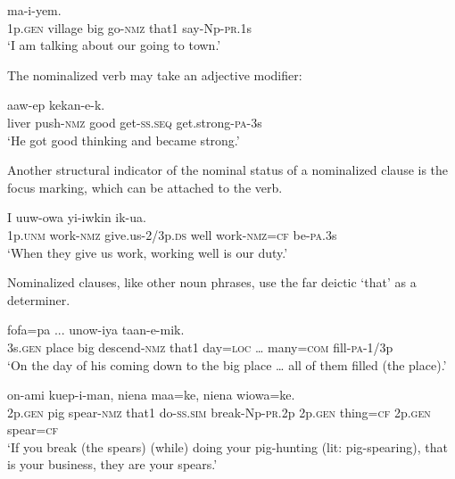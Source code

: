 \ea%
\label{ex:5:x1228}
\gll {}      ma-i-yem. \\
     1p.\textsc{gen}  village  big  go-\textsc{nmz}  that1  say-Np-\textsc{pr}.1s \\
\glt `I am talking about our going to town.'
\z

The nominalized verb may take an adjective modifier:

\ea%
\label{ex:5:x1240}
\gll {}    aaw-ep  kekan-e-k. \\
     liver  push-\textsc{nmz}  good  get-\textsc{ss}.\textsc{seq}  get.strong-\textsc{pa}-3s \\
\glt `He got good thinking and became strong.'
\z

Another structural indicator of the nominal status of a nominalized clause is the focus marking, which can be attached to the verb. 

\ea%
\label{ex:5:x1238}
\gll I  uuw-owa  yi-iwkin    ik-ua. \\
     1p.\textsc{unm}  work-\textsc{nmz}  give.us-2/3p.\textsc{ds}  well  work-\textsc{nmz}=\textsc{cf} be-\textsc{pa}.3s \\
\glt `When they give us work, working well is our duty.'
\z

Nominalized clauses, like other noun phrases, use the far deictic  `that' as a determiner. 

\ea%
\label{ex:5:x1842}
    fofa=pa  ...  unow-iya taan-e-mik. \\
     3s.\textsc{gen}  place  big  descend-\textsc{nmz}  that1  day=\textsc{loc}  {\dots}  many=\textsc{com} fill-\textsc{pa}-1/3p \\
\glt `On the day of his coming down to the big place {\dots} all of them filled (the place).'
\z

\ea%
\label{ex:5:x1843}
    on-ami  kuep-i-man, niena  maa=ke,  niena  wiowa=ke. \\
     2p.\textsc{gen}  pig  spear-\textsc{nmz}  that1  do-\textsc{ss}.\textsc{sim}  break-Np-\textsc{pr}.2p 2p.\textsc{gen}  thing=\textsc{cf}  2p.\textsc{gen}  spear=\textsc{cf} \\
\glt `If you break (the spears) (while) doing your pig-hunting (lit: pig-spearing), that is your business, they are your spears.'
\z


